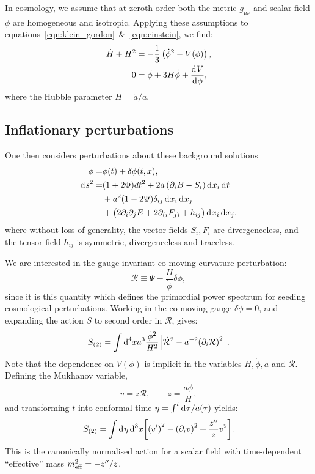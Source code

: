 In cosmology, we assume that at zeroth order both the metric $g_{\mu\nu}$ and scalar field $\phi$ are homogeneous and isotropic. Applying these assumptions to equations~\eqref{eqn:klein_gordon}~\&~\eqref{eqn:einstein}, we find:
\begin{align}
  \dot{H}+H^2 &= -\frac{1}{3}\left( \dot{\phi}^2 - V(\phi) \right),
  \label{eqn:Raychaudhuri}\\
  0&=\ddot{\phi} + 3H\dot{\phi} + \frac{\operatorname{d}^{}\!{V}}{\operatorname{d}^{}\!{\phi}},
\end{align}
where the Hubble parameter $H = \dot{a}/a$.
\subsection{Inflationary perturbations}
One then considers perturbations about these background solutions 
\begin{align}
  \phi=&\phi(t) + \delta\phi(t,x),
  \label{eqn:phi_perturbation} \\
  \operatorname{d}^{}\!{s}^2 =& (1+2\Phi)dt^2 + 2a\left( \partial_i B-S_i \right)\operatorname{d}^{}\!{x_i} \operatorname{d}^{}\!{t} \nonumber\\
  &+a^2(1-2\Psi)\delta_{ij} \operatorname{d}^{}\!{x_i} \operatorname{d}^{}\!{x_j} \nonumber\\
  &+\left( 2\partial_i\partial_jE + 2\partial_{(i}F_{j)} + h_{ij} \right) \operatorname{d}^{}\!{x_i}\operatorname{d}^{}\!{x_j},
\end{align}
where without loss of generality, the vector fields $S_i,F_i$ are divergenceless, and the tensor field $h_{ij}$ is symmetric, divergenceless and traceless.

We are interested in the gauge-invariant co-moving curvature perturbation:
\begin{equation}
  \mathcal{R}\equiv \Psi - \frac{H}{\dot{\phi}}\delta\phi,
  \label{eqn:R_action}
\end{equation}
since it is this quantity which defines the primordial power spectrum for seeding cosmological perturbations. Working in the co-moving gauge $\delta\phi=0$, and expanding the action $S$ to second order in $\mathcal{R}$, gives:
\begin{equation}
  S_{(2)} =  \int \d[4]{x} a^3\frac{\dot{\phi}^2}{H^2}{\left[ \dot{\mathcal{R}}^2 - a^{-2} {\left( \partial_i\mathcal{R} \right)}^2 \right]}.
  \label{eqn:R_action}
\end{equation}
Note that the dependence on $V(\phi)$ is implicit in the variables $H,\dot{\phi},a$ and $\mathcal{R}$.
Defining the Mukhanov variable,
\begin{equation}
  v = z\mathcal{R},\qquad z=\frac{a\dot{\phi}}{H},
  \label{eqn:mukhanov_variable}
\end{equation}
and transforming $t$ into conformal time $\eta = \int^t \operatorname{d}^{}\!{\tau}/a(\tau) $ yields:
\begin{equation}                                 
  S_{(2)} =  \int \d{\eta} \d[3]{x} {\left[ {\left( \prm{v} \right)}^2 - {\left( \partial_i v \right)}^2 + \frac{\dprm{z}}{z} v^2 \right]}.
  \label{eqn:v_action}
\end{equation}
This is the canonically normalised action for a scalar field with time-dependent ``effective'' mass $m_\mathrm{eff}^2 = -{{z}^{\prime\prime}}/z$.

